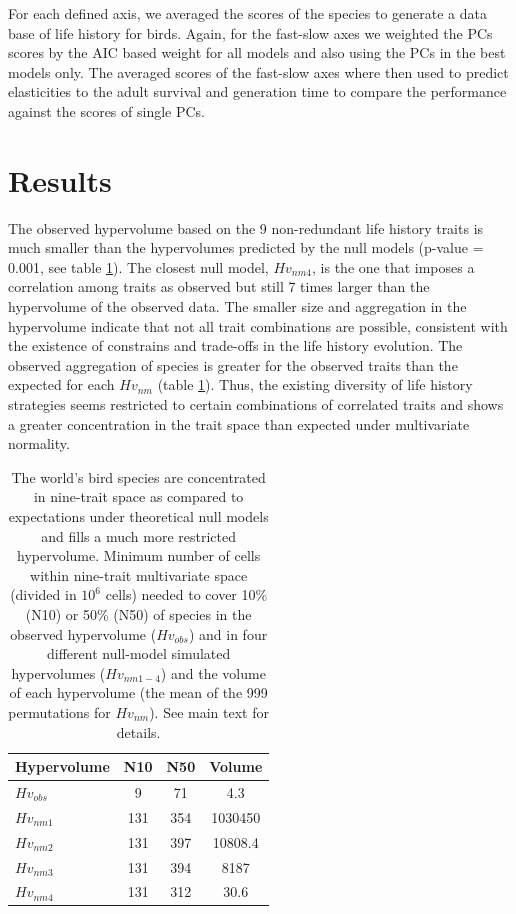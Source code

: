 For each defined axis, we averaged the scores of the species to generate a data 
base of life history for birds. Again, for the fast-slow axes we weighted the
PCs scores by the AIC based weight for all models and also using the PCs in the
best models only. The averaged scores of the fast-slow axes where then used to
predict elasticities to the adult survival and generation time to compare the
performance against the scores of single PCs.


\section{Results}

The observed hypervolume based on the 9 non-redundant life history traits is 
much smaller than the hypervolumes predicted by the null models (p-value = 
0.001, see table \ref{tab:table2.2}). The closest null model, $Hv_{nm4}$, is
the one that imposes a correlation among traits as observed but still 7 times 
larger than the hypervolume of the observed data. The smaller size and 
aggregation in the hypervolume indicate that not all trait combinations are 
possible, consistent with the existence of constrains and trade-offs in the life 
history evolution. The observed aggregation of species is greater for the 
observed traits than the expected for each $Hv_{nm}$ (table
\ref{tab:table2.2}). Thus, the existing diversity of life history strategies 
seems restricted to certain combinations of correlated traits and shows a 
greater concentration in the trait space than expected under multivariate 
normality.

\begin{table}
\center
\caption[Species' concentration and hypervolumes]{The world's bird species are
concentrated in nine-trait space as compared to expectations under theoretical
null models and fills a much more restricted hypervolume. Minimum number of 
cells within nine-trait multivariate space (divided in $10^{6}$ cells) needed to
cover 10\% (N10) or 50\% (N50) of species in the observed hypervolume 
($Hv_{obs}$) and in four different null-model simulated hypervolumes 
($Hv_{nm1-4}$) and the volume of each hypervolume (the mean of the 999 
permutations for $Hv_{nm}$). See main text for details.}
\label{tab:table2.2}
\begin{tabular}[b]{@{}lccc@{}}
\toprule
\textbf{Hypervolume} & \textbf{N10} & \textbf{N50} & \textbf{Volume} \\
\midrule
$Hv_{obs}$  & 9   & 71  & 4.3 \\
$Hv_{nm1}$  & 131 & 354 & 1030450 \\
$Hv_{nm2}$  & 131 & 397 & 10808.4 \\
$Hv_{nm3}$  & 131 & 394 & 8187 \\
$Hv_{nm4}$  & 131 & 312 & 30.6 \\
\bottomrule
\end{tabular}
\end{table}

